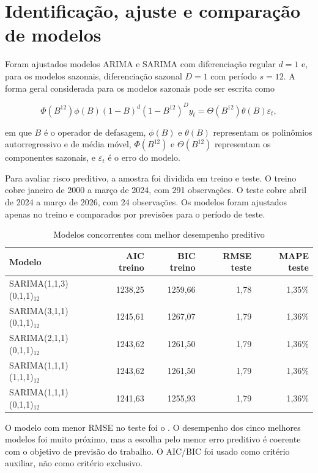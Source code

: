 ﻿\section{Identificação, ajuste e comparação de modelos}

Foram ajustados modelos ARIMA e SARIMA com diferenciação regular $d=1$ e, para os modelos sazonais, diferenciação sazonal $D=1$ com período $s=12$. A forma geral considerada para os modelos sazonais pode ser escrita como

\[
\Phi(B^{12})\phi(B)(1-B)^d(1-B^{12})^D y_t =
\Theta(B^{12})\theta(B)\varepsilon_t,
\]

em que $B$ é o operador de defasagem, $\phi(B)$ e $\theta(B)$ representam os polinômios autorregressivo e de média móvel, $\Phi(B^{12})$ e $\Theta(B^{12})$ representam os componentes sazonais, e $\varepsilon_t$ é o erro do modelo.

Para avaliar risco preditivo, a amostra foi dividida em treino e teste. O treino cobre janeiro de 2000 a março de 2024, com 291 observações. O teste cobre abril de 2024 a março de 2026, com 24 observações. Os modelos foram ajustados apenas no treino e comparados por previsões para o período de teste.

\begin{table}[H]
\centering
\caption{Modelos concorrentes com melhor desempenho preditivo}
\begin{tabular}{lrrrr}
\toprule
Modelo & AIC treino & BIC treino & RMSE teste & MAPE teste \\
\midrule
SARIMA(1,1,3)(0,1,1)$_{12}$ & 1238,25 & 1259,66 & 1,78 & 1,35\% \\
SARIMA(3,1,1)(0,1,1)$_{12}$ & 1245,61 & 1267,07 & 1,79 & 1,36\% \\
SARIMA(2,1,1)(0,1,1)$_{12}$ & 1243,62 & 1261,50 & 1,79 & 1,36\% \\
SARIMA(1,1,1)(1,1,1)$_{12}$ & 1243,62 & 1261,50 & 1,79 & 1,36\% \\
SARIMA(1,1,1)(0,1,1)$_{12}$ & 1241,63 & 1255,93 & 1,79 & 1,36\% \\
\bottomrule
\end{tabular}
\end{table}

O modelo com menor RMSE no teste foi o \sarimafinal. O desempenho dos cinco melhores modelos foi muito próximo, mas a escolha pelo menor erro preditivo é coerente com o objetivo de previsão do trabalho. O AIC/BIC foi usado como critério auxiliar, não como critério exclusivo.

